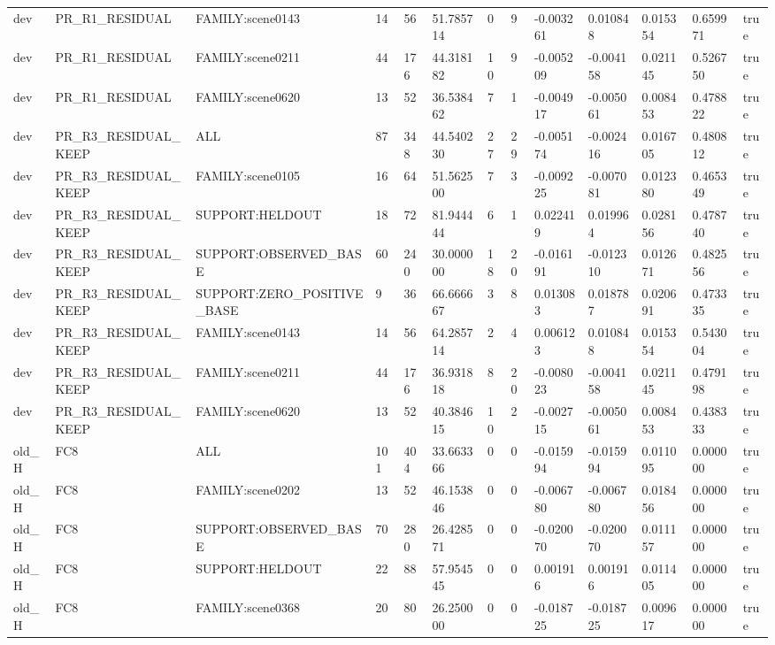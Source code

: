 \begin{tabular}{lllllllllllll}
dev & PR\_R1\_RESIDUAL & FAMILY:scene0143 & 14 & 56 & 51.785714 & 0 & 9 & -0.003261 & 0.010848 & 0.015354 & 0.659971 & true \\
dev & PR\_R1\_RESIDUAL & FAMILY:scene0211 & 44 & 176 & 44.318182 & 10 & 9 & -0.005209 & -0.004158 & 0.021145 & 0.526750 & true \\
dev & PR\_R1\_RESIDUAL & FAMILY:scene0620 & 13 & 52 & 36.538462 & 7 & 1 & -0.004917 & -0.005061 & 0.008453 & 0.478822 & true \\
dev & PR\_R3\_RESIDUAL\_KEEP & ALL & 87 & 348 & 44.540230 & 27 & 29 & -0.005174 & -0.002416 & 0.016705 & 0.480812 & true \\
dev & PR\_R3\_RESIDUAL\_KEEP & FAMILY:scene0105 & 16 & 64 & 51.562500 & 7 & 3 & -0.009225 & -0.007081 & 0.012380 & 0.465349 & true \\
dev & PR\_R3\_RESIDUAL\_KEEP & SUPPORT:HELDOUT & 18 & 72 & 81.944444 & 6 & 1 & 0.022419 & 0.019964 & 0.028156 & 0.478740 & true \\
dev & PR\_R3\_RESIDUAL\_KEEP & SUPPORT:OBSERVED\_BASE & 60 & 240 & 30.000000 & 18 & 20 & -0.016191 & -0.012310 & 0.012671 & 0.482556 & true \\
dev & PR\_R3\_RESIDUAL\_KEEP & SUPPORT:ZERO\_POSITIVE\_BASE & 9 & 36 & 66.666667 & 3 & 8 & 0.013083 & 0.018787 & 0.020691 & 0.473335 & true \\
dev & PR\_R3\_RESIDUAL\_KEEP & FAMILY:scene0143 & 14 & 56 & 64.285714 & 2 & 4 & 0.006123 & 0.010848 & 0.015354 & 0.543004 & true \\
dev & PR\_R3\_RESIDUAL\_KEEP & FAMILY:scene0211 & 44 & 176 & 36.931818 & 8 & 20 & -0.008023 & -0.004158 & 0.021145 & 0.479198 & true \\
dev & PR\_R3\_RESIDUAL\_KEEP & FAMILY:scene0620 & 13 & 52 & 40.384615 & 10 & 2 & -0.002715 & -0.005061 & 0.008453 & 0.438333 & true \\
old\_H & FC8 & ALL & 101 & 404 & 33.663366 & 0 & 0 & -0.015994 & -0.015994 & 0.011095 & 0.000000 & true \\
old\_H & FC8 & FAMILY:scene0202 & 13 & 52 & 46.153846 & 0 & 0 & -0.006780 & -0.006780 & 0.018456 & 0.000000 & true \\
old\_H & FC8 & SUPPORT:OBSERVED\_BASE & 70 & 280 & 26.428571 & 0 & 0 & -0.020070 & -0.020070 & 0.011157 & 0.000000 & true \\
old\_H & FC8 & SUPPORT:HELDOUT & 22 & 88 & 57.954545 & 0 & 0 & 0.001916 & 0.001916 & 0.011405 & 0.000000 & true \\
old\_H & FC8 & FAMILY:scene0368 & 20 & 80 & 26.250000 & 0 & 0 & -0.018725 & -0.018725 & 0.009617 & 0.000000 & true \\

\end{tabular}
